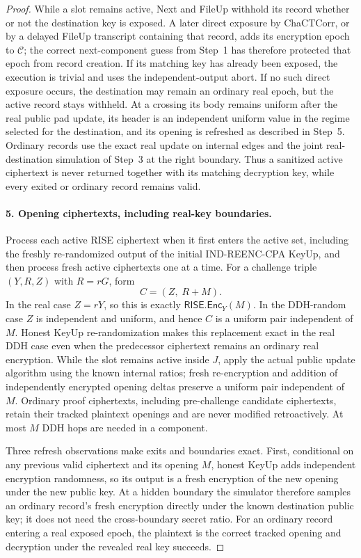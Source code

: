 \begin{proof}
While a slot remains active, Next and FileUp withhold its record whether or not the destination key is exposed. A later direct exposure by ChaCTCorr, or by a delayed FileUp transcript containing that record, adds its encryption epoch to $\mathcal C$; the correct next-component guess from Step~1 has therefore protected that epoch from record creation. If its matching key has already been exposed, the execution is trivial and uses the independent-output abort. If no such direct exposure occurs, the destination may remain an ordinary real epoch, but the active record stays withheld. At a crossing its body remains uniform after the real public pad update, its header is an independent uniform value in the regime selected for the destination, and its opening is refreshed as described in Step~5. Ordinary records use the exact real update on internal edges and the joint real-destination simulation of Step~3 at the right boundary. Thus a sanitized active ciphertext is never returned together with its matching decryption key, while every exited or ordinary record remains valid.

\paragraph{5. Opening ciphertexts, including real-key boundaries.}
Process each active RISE ciphertext when it first enters the active set, including the freshly re-randomized output of the initial IND-REENC-CPA KeyUp, and then process fresh active ciphertexts one at a time. For a challenge triple $(Y,R,Z)$ with $R=rG$, form
\[
 C=(Z,\;R+M).
\]
In the real case $Z=rY$, so this is exactly $\mathsf{RISE.Enc}_Y(M)$. In the DDH-random case $Z$ is independent and uniform, and hence $C$ is a uniform pair independent of $M$. Honest KeyUp re-randomization makes this replacement exact in the real DDH case even when the predecessor ciphertext remains an ordinary real encryption. While the slot remains active inside $J$, apply the actual public update algorithm using the known internal ratios; fresh re-encryption and addition of independently encrypted opening deltas preserve a uniform pair independent of $M$. Ordinary proof ciphertexts, including pre-challenge candidate ciphertexts, retain their tracked plaintext openings and are never modified retroactively. At most $M$ DDH hops are needed in a component.

Three refresh observations make exits and boundaries exact. First, conditional on any previous valid ciphertext and its opening $M$, honest KeyUp adds independent encryption randomness, so its output is a fresh encryption of the new opening under the new public key. At a hidden boundary the simulator therefore samples an ordinary record's fresh encryption directly under the known destination public key; it does not need the cross-boundary secret ratio. For an ordinary record entering a real exposed epoch, the plaintext is the correct tracked opening and decryption under the revealed real key succeeds.


\end{proof}
